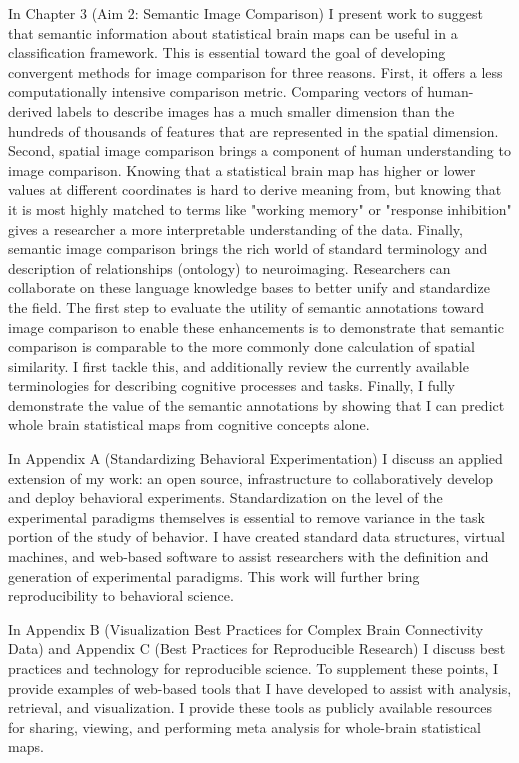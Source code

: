 \documentclass{report}
\begin{document}
In Chapter 3 (Aim 2: Semantic Image Comparison) I present work to
suggest that semantic information about statistical brain maps can be
useful in a classification framework. This is essential toward the goal of developing convergent methods for image comparison for three reasons. First, it offers a less computationally intensive comparison metric. Comparing vectors of human-derived labels to describe images has a much smaller dimension than the hundreds of thousands of features that are represented in the spatial dimension. Second, spatial image comparison brings a component of human understanding to image comparison. Knowing that a statistical brain map has higher or lower values at different coordinates is hard to derive meaning from, but knowing that it is most highly matched to terms like "working memory" or "response inhibition" gives a researcher a more interpretable understanding of the data. Finally, semantic image comparison brings the rich world of standard terminology and description of relationships (ontology) to neuroimaging. Researchers can collaborate on these language knowledge bases to better unify and standardize the field. The first step to evaluate the utility of semantic annotations toward image comparison to enable these enhancements is to demonstrate that semantic comparison is comparable to the more commonly done calculation of spatial similarity. I first tackle this, and additionally review the currently available terminologies for describing cognitive processes and tasks. Finally, I fully demonstrate the value of the semantic annotations by showing that I can predict whole brain statistical maps from cognitive concepts alone.

In Appendix A (Standardizing Behavioral Experimentation) I discuss
an applied extension of my work: an open source, infrastructure to
collaboratively develop and deploy behavioral experiments. Standardization on the level of the experimental paradigms themselves is essential to remove variance in the task portion of the study of behavior. I have
created standard data structures, virtual machines, and web-based
software to assist researchers with the definition and generation of
experimental paradigms. This work will further bring reproducibility to
behavioral science.

In Appendix B (Visualization Best Practices for Complex Brain Connectivity Data) and Appendix C (Best Practices for Reproducible Research) I discuss
best practices and technology for reproducible science. To supplement
these points, I provide examples of web-based tools that I have
developed to assist with analysis, retrieval, and visualization. I
provide these tools as publicly available resources for sharing,
viewing, and performing meta analysis for whole-brain statistical maps.
\end{document}
